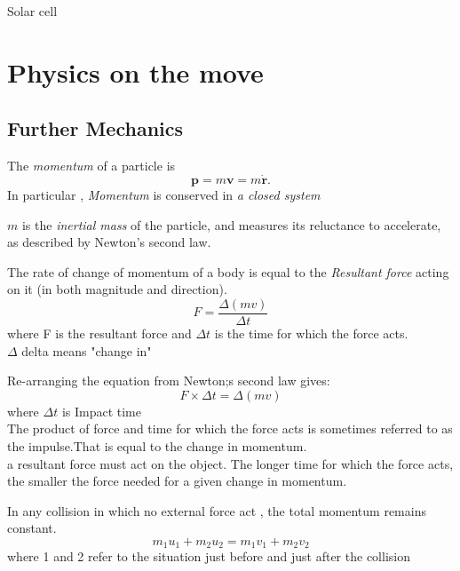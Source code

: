 \documentclass[a4paper]{article}
\begin{document}
Solar cell

\section{Physics on the move}
\subsection{Further Mechanics}
\begin{defi}[Momentum]
  The \emph{momentum} of a particle is
  \[
    \mathbf{p} = m\mathbf{v} = m\dot{\mathbf{r}}.
  \]
  In particular , \emph{Momentum} is conserved in \emph{a closed system}
  
  $m$ is the \emph{inertial mass} of the particle, and measures its reluctance to accelerate, as described by Newton's second law.
\end{defi}

\begin{law}
   The rate of change of momentum of a body is equal to the \emph{Resultant force} acting on it (in both magnitude and direction).
   \begin{equation*}
       F=\frac{\Delta(mv)}{\Delta t}
   \end{equation*}
   where F is the resultant force and $\Delta t$ is the time for which the force acts.\\
   $\Delta$ delta means "change in"
\end{law}

\begin{defi}[Impulse]
Re-arranging the equation from Newton;s second law gives:
\begin{equation*}
    F \times \Delta t= \Delta (mv)
\end{equation*}
where $\Delta t$ is Impact time\\
The product of force and time for which the force acts is sometimes referred to as the impulse.That is equal to the change in momentum.\\

a resultant force must act on the object. The longer time for which the force acts, the smaller the force needed for a given change in momentum.

\end{defi}

\begin{defi}
In any collision in which no external force act , the total momentum remains constant.
\begin{equation*}
    m_1u_1+m_2u_2=m_1v_1+m_2v_2
\end{equation*}
where 1 and 2 refer to the situation just before and just after the collision
\end{defi}
\end{document}
